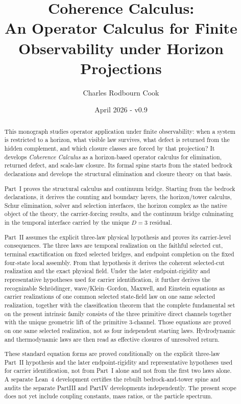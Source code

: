 \documentclass[11pt]{article}
\title{Coherence Calculus:\\
An Operator Calculus for Finite Observability under Horizon Projections}
\author{Charles Rodbourn Cook}
\date{April 2026 - v0.9}
\theoremstyle{definition}
\theoremstyle{remark}
\theoremstyle{definition}
\begin{document}
\maketitle

\begin{abstract}
This monograph studies operator application under finite observability: when a
system is restricted to a horizon, what visible law survives, what defect is
returned from the hidden complement, and which closure classes are forced by
that projection? It develops \emph{Coherence Calculus} as a horizon-based
operator calculus for elimination, returned defect, and scale-law closure. Its
formal spine starts from the stated bedrock declarations and develops the
structural elimination and closure theory on that basis.

Part~I proves the structural calculus and continuum bridge. Starting from the
bedrock declarations, it derives the counting and boundary layers, the
horizon/tower calculus, Schur elimination, solver and selection interfaces,
the horizon complex as the native object of the theory, the carrier-forcing
results, and the continuum bridge culminating in the temporal interface
carried by the unique \(D=3\) residual.

Part~II assumes the explicit three-law physical hypothesis and proves its
carrier-level consequences. The three laws are temporal realization on the
faithful selected cut, terminal exactification on fixed selected bridges, and
endpoint completion on the fixed four-state local assembly. From that
hypothesis it derives the coherent selected-cut
realization and the exact physical field. Under the later endpoint-rigidity
and representative hypotheses used for carrier identification, it further
derives the recognizable Schr\"odinger, wave/Klein--Gordon, Maxwell, and
Einstein equations as carrier realizations of one common selected state-field
law on one same selected realization, together with the classification theorem
that the complete fundamental set on the present intrinsic family consists of
the three primitive direct channels together with the unique geometric lift of
the primitive \(3\)-channel. Those equations are proved on one same selected
realization, not as four independent starting laws. Hydrodynamic and
thermodynamic laws are then read as
effective closures of unresolved return.

These standard equation forms are proved conditionally on the explicit
three-law Part~II hypothesis and the later endpoint-rigidity and
representative hypotheses used for carrier identification, not from Part~I
alone and not from the first two laws alone. A separate Lean~4 development
certifies the rebuilt bedrock-and-tower spine and audits the separate PartIII
and PartIV developments independently. The present scope does not yet include
coupling constants, mass ratios, or the particle spectrum.
\end{abstract}
\end{document}
